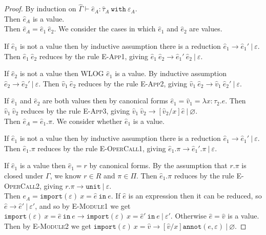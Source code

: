 \documentclass{llncs}
\newcommand{\keywadj}[1]{\mathtt{#1}}
\newcommand{\keyw}[1]{\keywadj{#1}~}
\newcommand{\kw}[1]{\keyw{ #1 }}
\newcommand{\kwa}[1]{\keywadj{ #1 }}
\newcommand{\module}[0]{
\kwa{import}(\varepsilon)~x = \hat e~\kwa{in}~e
}
\begin{document}
\begin{proof}
By induction on $\hat \Gamma \vdash \hat e_A: \hat \tau_A~\kw{with} \varepsilon_A$.\\

\noindent
{}
Then $\hat e_A$ is a value. \\

\noindent
{}
Then $\hat e_A = \hat e_1~\hat e_2$. We consider the cases in which $\hat e_1$ and $\hat e_2$ are values.

If $\hat e_1$ is not a value then by inductive assumption there is a reduction $\hat e_1 \longrightarrow \hat e_1'~|~\varepsilon$. Then $\hat e_1~\hat e_2$ reduces by the rule \textsc{E-App1}, giving $\hat e_1~\hat e_2 \longrightarrow \hat e_1'~\hat e_2~|~\varepsilon$.

If $\hat e_2$ is not a value then WLOG $\hat e_1$ is a value. By inductive assumption $\hat e_2 \longrightarrow \hat e_2'~|~\varepsilon$. Then $\hat v_1~\hat e_2$ reduces by the rule \textsc{E-App2}, giving $\hat v_1~\hat e_2 \longrightarrow \hat v_1~\hat e_2'~|~\varepsilon$.

If $\hat e_1$ and $\hat e_2$ are both values then by canonical forms $\hat e_1 = \hat v_1 = \lambda x: \tau_2.e$. Then $\hat v_1~\hat v_2$ reduces by the rule \textsc{E-App3}, giving $\hat v_1~\hat v_2 \longrightarrow [\hat v_2/x]\hat e ~|~\varnothing$. \\

\noindent
{} Then $\hat e_A = \hat e_1.\pi$. We consider whether $\hat e_1$ is a value.

If $\hat e_1$ is not a value then by inductive assumption there is a reduction $\hat e_1 \longrightarrow \hat e_1'~|~\varepsilon$. Then $\hat e_1.\pi$ reduces by the rule \textsc{E-OperCall1}, giving $\hat e_1.\pi \longrightarrow \hat e_1'.\pi~|~\varepsilon$.

If $\hat e_1$ is a value then $\hat e_1 = r$ by canonical forms. By the assumption that $r.\pi$ is closed under $\Gamma$, we know $r \in R$ and $\pi \in \Pi$. Then $\hat e_1.\pi$ reduces by the rule \textsc{E-OperCall2}, giving $r.\pi \longrightarrow \kwa{unit}~|~\varepsilon$. \\

\noindent
{}
Then $e_A = \module$. If $\hat e$ is an expression then it can be reduced, so $\hat e \longrightarrow \hat e' ~|~\varepsilon'$, and so by \textsc{E-Module1} we get $\module \longrightarrow \kwa{import}(\varepsilon)~x = \hat e'~\kw{in} e ~|~\varepsilon'$. Otherwise $\hat e = \hat v$ is a value. Then by \textsc{E-Module2} we get $\kwa{import}(\varepsilon)~x = \hat v \longrightarrow [\hat v/x]\kwa{annot}(e, \varepsilon)~|~\varnothing$.
\end{proof}
\end{document}
